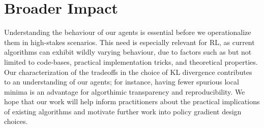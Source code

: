 \documentclass{article}
\begin{document}
\section*{Broader Impact}
Understanding the behaviour of our agents is essential before we operationalize them in high-stakes scenarios. This need is especially relevant for RL, as current algorithms can exhibit wildly varying behaviour, due to factors such as but not limited to code-bases, practical implementation tricks, and theoretical properties. Our characterization of the tradeoffs in the choice of KL divergence contributes to an understanding of our agents; for instance, having fewer spurious local minima is an advantage for algorthimic transparency and reproducibility. We hope that our work will help inform practitioners about the practical implications of existing algorithms and motivate further work into policy gradient design choices. 


\begin{ack}
\end{ack}


\end{document}
